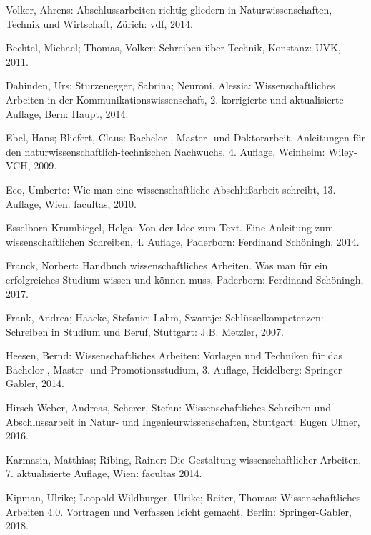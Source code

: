 \documentclass[a4paper,11pt]{article}%
\renewcommand{\\}{\vspace*{0.5\baselineskip} \newline}
\begin{document}
\begin{thebibliography}{1}
	
	Volker, Ahrens: 
	Abschlussarbeiten richtig gliedern in Naturwissenschaften, Technik und Wirtschaft,
	Zürich: vdf, 
	2014.
	
	Bechtel, Michael; Thomas, Volker:
	Schreiben über Technik,
	Konstanz: UVK,
	2011.
	
	Dahinden, Urs; Sturzenegger, Sabrina; Neuroni, Alessia:
	Wissenschaftliches Arbeiten in der Kommunikationswissenschaft, 2. korrigierte und aktualisierte Auflage, 
	Bern: Haupt,
	2014.
	
	Ebel, Hans; Bliefert, Claus: 
	Bachelor-, Master- und Doktorarbeit. Anleitungen für den naturwissenschaftlich-technischen Nachwuchs, 4. Auflage, Weinheim: Wiley-VCH,
	2009.
	
	Eco, Umberto: 
	Wie man eine wissenschaftliche Abschlußarbeit schreibt, 13. Auflage,
	Wien: facultas,
	2010.
	
	Esselborn-Krumbiegel, Helga: 
	Von der Idee zum Text. Eine Anleitung zum wissenschaftlichen Schreiben, 4. Auflage,
	Paderborn: Ferdinand Schöningh,
	2014.
	
	Franck, Norbert: Handbuch wissenschaftliches Arbeiten. Was man für ein erfolgreiches Studium wissen und können muss, Paderborn: Ferdinand Schöningh,
	2017.
	
	Frank, Andrea; Haacke, Stefanie; Lahm, Swantje: Schlüsselkompetenzen: Schreiben in Studium und Beruf,
	Stuttgart: J.B. Metzler,
	2007.
	
	Heesen, Bernd: Wissenschaftliches Arbeiten: Vorlagen und Techniken für das Bachelor-, Master- und Promotionsstudium, 3. Auflage, 
	Heidelberg: Springer-Gabler,
	2014.
	
	Hirsch-Weber, Andreas, Scherer, Stefan: Wissenschaftliches Schreiben und Abschlussarbeit in Natur- und Ingenieurwissenschaften,
	Stuttgart: Eugen Ulmer,
	2016.
	
	Karmasin, Matthias; Ribing, Rainer: Die Gestaltung wissenschaftlicher Arbeiten, 7. aktualisierte Auflage,
	Wien: facultas
	2014.
	
	Kipman, Ulrike; Leopold-Wildburger, Ulrike; Reiter, Thomas: Wissenschaftliches Arbeiten 4.0. Vortragen und Verfassen leicht gemacht,
	Berlin: Springer-Gabler,
	2018.
	

\end{thebibliography}
\end{document}
